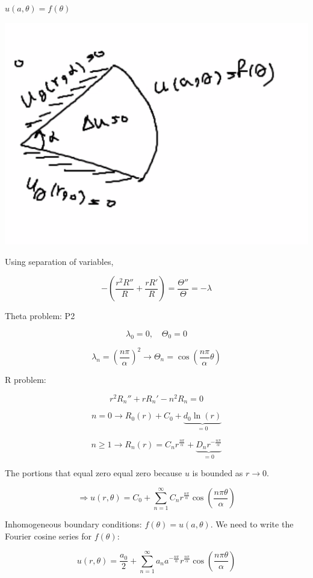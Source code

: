 \documentclass{article}
\begin{document}
$u(a, \theta) = f(\theta)$

\begin{center}
    \includegraphics[width = 0.4 \textwidth]{8.png}
\end{center}

Using separation of variables, 

$$- \left( \frac{r^2 R''}{R} + \frac{r R'}{R} \right) = \frac{\Theta''}{\Theta} = - \lambda$$

Theta problem: P2

$$\lambda_0 = 0, \quad \Theta_0 = 0$$

$$\lambda_n = \left( \frac{n \pi}{\alpha} \right)^2 \to \Theta_n = \cos \left( \frac{n \pi}{\alpha} \theta \right)$$

R problem:

$$r^2 R_n'' + r R_n' - n^2 R_n = 0$$





$$n = 0 \to R_0(r) + C_0 + \underbrace{d_0 \ln(r)}_{ = 0}$$

$$n \geq 1 \to R_n(r) = C_n r^{\frac{n \pi}{\alpha}} + \underbrace{D_n r^{- \frac{n \pi}{\alpha}}}_{ = 0}$$

The portions that equal zero equal zero because $u$ is bounded as $r \to 0$. 




$$\Rightarrow u(r, \theta) = C_0 + \sum_{n=1}^\infty C_n r^{\frac{n \pi}{\alpha}} \cos \left( \frac{n \pi \theta}{\alpha} \right)$$

Inhomogeneous boundary conditions: $f(\theta) = u(a, \theta)$. We need to write the Fourier cosine series for $f(\theta)$:

$$u(r, \theta) = \frac{a_0}{2} + \sum_{n=1}^\infty a_n a^{- \frac{n \pi}{\alpha}} r^{\frac{n \pi}{\alpha}} \cos \left( \frac{n \pi \theta}{\alpha} \right)$$
\end{document}
